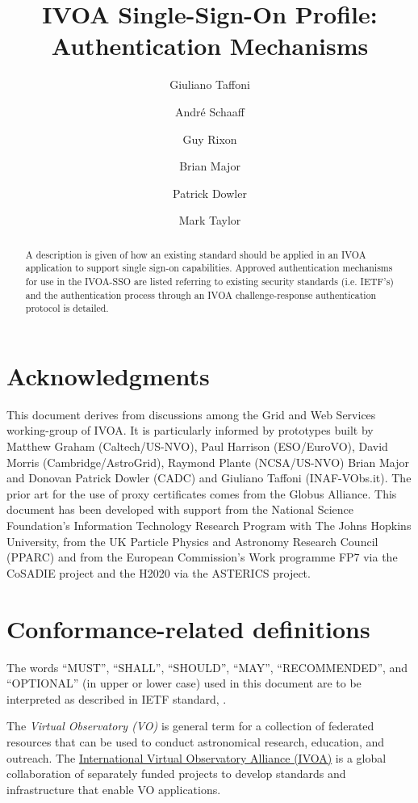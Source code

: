 \documentclass[11pt,a4paper]{ivoa}
\title{IVOA Single-Sign-On Profile: Authentication Mechanisms}
\author{Giuliano Taffoni}
\author{Andr\'e Schaaff}
\author{Guy Rixon}
\author{Brian Major}
\author{Patrick Dowler}
\author{Mark Taylor}
\begin{document}
\begin{abstract}

A description is given of how an existing standard should be applied
in an IVOA application to support single sign-on capabilities.
Approved authentication mechanisms for use in the IVOA-SSO are listed
referring to existing security standards (i.e. IETF's) and the
authentication process through an IVOA challenge-response
authentication protocol is detailed.
\end{abstract}

\section*{Acknowledgments}

This document derives from discussions among the Grid and Web Services
working-group of IVOA. It is particularly informed by prototypes built
by Matthew Graham (Caltech/US-NVO), Paul Harrison (ESO/EuroVO), David
Morris (Cambridge/AstroGrid), Raymond Plante (NCSA/US-NVO) Brian Major
and  Donovan Patrick Dowler (CADC) and Giuliano Taffoni (INAF-VObs.it).
The prior art for the use of proxy certificates comes from the Globus
Alliance.
This document has been developed with support from the National Science
Foundation's Information Technology Research Program  with The Johns
Hopkins University, from the UK Particle Physics and Astronomy Research
Council (PPARC) and from the European Commission's Work programme FP7
via the  CoSADIE project and the H2020 via the ASTERICS project.


\section*{Conformance-related definitions}
The words ``MUST'', ``SHALL'', ``SHOULD'', ``MAY'', ``RECOMMENDED'', and
``OPTIONAL'' (in upper or lower case) used in this document are to be
interpreted as described in IETF standard, \citet{std:RFC2119}.

The \emph{Virtual Observatory (VO)} is
general term for a collection of federated resources that can be used
to conduct astronomical research, education, and outreach.
The \href{http://www.ivoa.net}{International
Virtual Observatory Alliance (IVOA)} is a global
collaboration of separately funded projects to develop standards and
infrastructure that enable VO applications.
\end{document}
